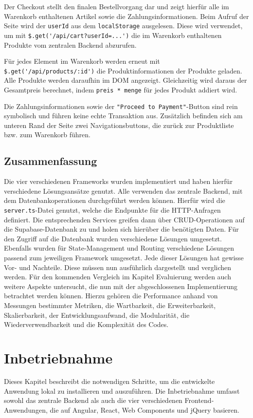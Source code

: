\documentclass[oneside]{ausarbeitung}
\begin{document}
Der Checkout stellt den finalen Bestellvorgang dar und zeigt hierfür alle im Warenkorb enthaltenen Artikel sowie die Zahlungsinformationen. Beim Aufruf der Seite wird der \texttt{userId} aus dem \texttt{localStorage} ausgelesen. Diese wird verwendet, um mit \verb|$.get('/api/cart?userId=...')| die im Warenkorb enthaltenen Produkte vom zentralen Backend abzurufen. 

Für jedes Element im Warenkorb werden erneut mit \verb|$.get('/api/products/:id')| die Produktinformationen der Produkte geladen. Alle Produkte werden daraufhin im DOM angezeigt. Gleichzeitig wird daraus der Gesamtpreis berechnet, indem \texttt{preis * menge} für jedes Produkt addiert wird. 

Die Zahlungsinformationen sowie der \texttt{"Proceed to Payment"}-Button sind rein symbolisch und führen keine echte Transaktion aus. Zusätzlich befinden sich am unteren Rand der Seite zwei Navigationsbuttons, die zurück zur Produktliste bzw. zum Warenkorb führen.

\section{Zusammenfassung}

Die vier verschiedenen Frameworks wurden implementiert und haben hierfür verschiedene Lösungsansätze genutzt. Alle verwenden das zentrale Backend, mit dem Datenbankoperationen durchgeführt werden können. Hierfür wird die \texttt{server.ts}-Datei genutzt, welche die Endpunkte für die HTTP-Anfragen definiert. Die entsprechenden Services greifen dann über CRUD-Operationen auf die Supabase-Datenbank zu und holen sich hierüber die benötigten Daten. Für den Zugriff auf die Datenbank wurden verschiedene Lösungen umgesetzt. Ebenfalls wurden für State-Management und Routing verschiedene Lösungen passend zum jeweiligen Framework umgesetzt. Jede dieser Lösungen hat gewisse Vor- und Nachteile. Diese müssen nun ausführlich dargestellt und verglichen werden. Für den kommenden Vergleich im Kapitel Evaluierung werden auch weitere Aspekte untersucht, die nun mit der abgeschlossenen Implementierung betrachtet werden können. Hierzu gehören die Performance anhand von Messungen bestimmter Metriken, die Wartbarkeit, die Erweiterbarkeit, Skalierbarkeit, der Entwicklungsaufwand, die Modularität, die Wiederverwendbarkeit und die Komplexität des Codes.


\chapter{Inbetriebnahme}
Dieses Kapitel beschreibt die notwendigen Schritte, um die entwickelte Anwendung lokal zu installieren und auszuführen. Die Inbetriebnahme umfasst sowohl das zentrale Backend als auch die vier verschiedenen Frontend-Anwendungen, die auf Angular, React, Web Components und jQuery basieren.
\end{document}
